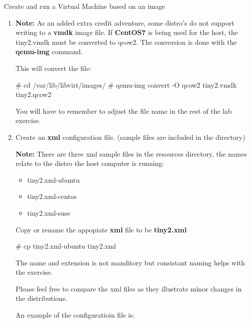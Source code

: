 \begin{Lab}
\begin{exe} {Create and run a Virtual Machine based on an image}
\begin{sol}
\begin{enumerate}
		\item

        \textbf{Note:} As an added extra credit adventure,
        some distro's do not support writing to a \textbf{vmdk}
        image file. If \textbf{CentOS7} is being used for the host,
        the tiny2.vmdk must be converted to qcow2. The
        conversion is done with the \textbf{qemu-img} command.

        This will convert the file:
                \begin{raw}
# cd /var/lib/libvirt/images/
# qemu-img convert -O qcow2 tiny2.vmdk tiny2.qcow2
                \end{raw}
        You will have to remember to adjust the file
        name in the rest of the lab exercise.


		\item Create an \textbf{xml} configuration file. 
			(sample files are included in the
				 directory)

		\textbf{Note:} There are three xml sample files 
				in the resources directory, the names 
				relate to the distro the host computer
				is running:
				\begin{itemize}
				\item tiny2.xml-ubuntu  
				\item tiny2.xml-centos
				\item tiny2.xml-suse
				\end{itemize}
				Copy or rename the appopiate 
				\textbf{xml} file to be \textbf{tiny2.xml} 
				\begin{raw}
# cp tiny2.xml-ubuntu tiny2.xml
				\end{raw}
				The name and extension is not manditory
				but consistant naming helps with the exercise.


				Please feel free to compare the xml files as 
				they illustrate minor changes in 
				the distributions.

				An example of the configuratioin file is: 


\end{enumerate}
\end{sol}
\end{exe}
\end{Lab}
